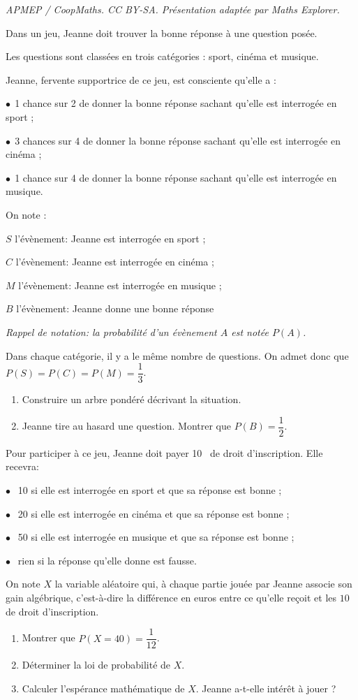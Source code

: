 \documentclass[10pt]{article}
\providecommand{\euro}{\texteuro}
\providecommand{\euro}{{\text{€}}}
\renewcommand{\euro}{\ifmmode\text{\texteuro}\else\texteuro\fi}
\begin{document}
\noindent\textit{APMEP / CoopMaths. CC BY-SA. Présentation adaptée par Maths Explorer.}\par\medskip
\medskip

Dans un jeu, Jeanne doit trouver la bonne réponse à une question posée.

Les questions sont classées en trois catégories : sport, cinéma et musique.

Jeanne, fervente supportrice de ce jeu, est consciente qu'elle a :

$\bullet~~$1 chance sur 2 de donner la bonne réponse sachant qu'elle est interrogée en sport ;

$\bullet~~$3 chances sur 4 de donner la bonne réponse sachant qu'elle est interrogée en cinéma ;
 
$\bullet~~$1 chance sur 4 de donner la bonne réponse sachant qu'elle est interrogée en musique.

On note :

\quad $S$ l'évènement: \og Jeanne est interrogée en sport\fg{} ;

\quad $C$ l'évènement: \og Jeanne est interrogée en cinéma\fg{} ; 

\quad $M$ l'évènement: \og Jeanne est interrogée en musique\fg{} ; 

\quad $B$ l'évènement: \og Jeanne donne une bonne réponse \fg


\emph{Rappel de notation: la probabilité d'un évènement $A$ est notée $P(A)$.}

Dans chaque catégorie, il y a le même nombre de questions. On admet donc que
$P(S) = P(C) = P(M) = \dfrac{1}{3}$.

\begin{enumerate}
\item Construire un arbre pondéré décrivant la situation.
\item Jeanne tire au hasard une question. Montrer que $P(B) = \dfrac{1}{2}$.
\end{enumerate}

Pour participer à ce jeu, Jeanne doit payer 10~\euro{} de droit d'inscription. Elle recevra:

$\bullet~~$ 10 \euro{} si elle est interrogée en sport et que sa réponse est bonne ;

$\bullet~~$ 20 \euro{} si elle est interrogée en cinéma et que sa réponse est bonne ;

$\bullet~~$ 50 \euro{} si elle est interrogée en musique et que sa réponse est bonne ;

$\bullet~~$ rien si la réponse qu'elle donne est fausse.

On note $X$ la variable aléatoire qui, à chaque partie jouée par Jeanne associe son gain algébrique, c'est-à-dire la différence en euros entre ce qu'elle reçoit et les $10$~\euro{} de droit d'inscription.

\begin{enumerate}[resume]
\item Montrer que $P(X = 40) = \dfrac{1}{12}$.
\item Déterminer la loi de probabilité de $X$.
\item Calculer l'espérance mathématique de $X$. Jeanne a-t-elle intérêt à jouer ?
\end{enumerate}
\end{document}
